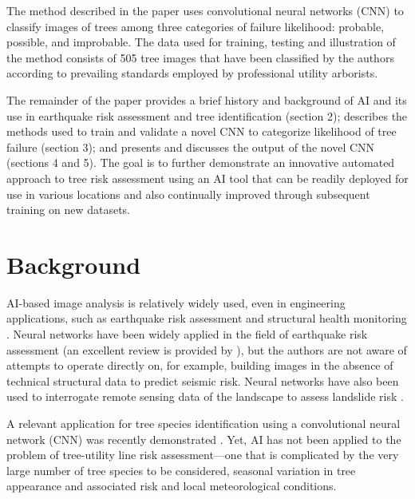 \documentclass[Journal,letterpaper, SingleSpace, InsideFigs]{ascelike-new}
\begin{document}
The method described in the paper uses convolutional neural networks (CNN) to classify images of trees among three categories of failure likelihood: probable, possible, and improbable.  The data used for training, testing and illustration of the method consists of 505 tree images that have been classified by the authors according to prevailing standards employed by professional utility arborists. 

The remainder of the paper provides a brief history and background of AI and its use in earthquake risk assessment and tree identification (section 2); describes the methods used to train and validate a novel CNN to categorize likelihood of tree failure (section 3); and presents and discusses the output of the novel CNN (sections 4 and 5). The goal is to further demonstrate an innovative automated approach to tree risk assessment using an AI tool that can be readily deployed for use in various locations and also continually improved through subsequent training on new datasets.



\section{Background}

AI-based image analysis is relatively widely used, even in engineering applications, such as earthquake risk assessment \cite{jiao2020artificial,salehi2018emerging} and structural health monitoring \cite{spencer2019advances,wang2019novel}. Neural networks have been widely applied in the field of earthquake risk assessment (an excellent review is provided by ), but the authors are not aware of attempts to operate directly on, for example, building images in the absence of technical structural data to predict seismic risk.  Neural networks have also been used to interrogate remote sensing data of the landscape to assess landslide risk \cite{su2020deep}.


A relevant application for tree species identification using a convolutional neural network (CNN) was recently demonstrated \cite{fricker2019convolutional}. Yet, AI has not been applied to the problem of tree-utility line risk assessment---one that is complicated by the very large number of tree species to be considered, seasonal variation in tree appearance and associated risk and local meteorological conditions. 
\end{document}
